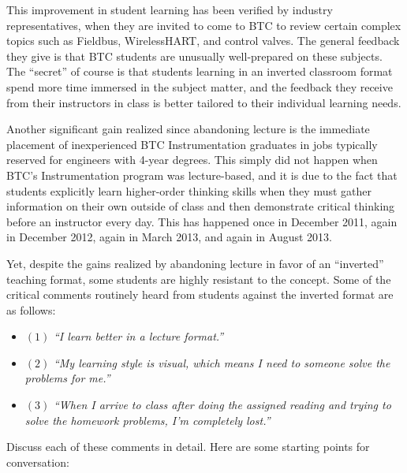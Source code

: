This improvement in student learning has been verified by industry representatives, when they are invited to come to BTC to review certain complex topics such as Fieldbus, WirelessHART, and control valves.  The general feedback they give is that BTC students are unusually well-prepared on these subjects.  The ``secret'' of course is that students learning in an inverted classroom format spend more time immersed in the subject matter, and the feedback they receive from their instructors in class is better tailored to their individual learning needs.

\vskip 10pt

Another significant gain realized since abandoning lecture is the immediate placement of inexperienced BTC Instrumentation graduates in jobs typically reserved for engineers with 4-year degrees.  This simply did not happen when BTC's Instrumentation program was lecture-based, and it is due to the fact that students explicitly learn higher-order thinking skills when they must gather information on their own outside of class and then demonstrate critical thinking before an instructor every day.  This has happened once in December 2011, again in December 2012, again in March 2013, and again in August 2013.

\vskip 20pt

Yet, despite the gains realized by abandoning lecture in favor of an ``inverted'' teaching format, some students are highly resistant to the concept.  Some of the critical comments routinely heard from students against the inverted format are as follows:

\begin{itemize}
\item{$(1)$} {\it ``I learn better in a lecture format.''}
\vskip 5pt
\item{$(2)$} {\it ``My learning style is visual, which means I need to  someone solve the problems for me.''}
\vskip 5pt
\item{$(3)$} {\it ``When I arrive to class after doing the assigned reading and trying to solve the homework problems, I'm completely lost.''}
\end{itemize}

\vskip 10pt

Discuss each of these comments in detail.  Here are some starting points for conversation:

